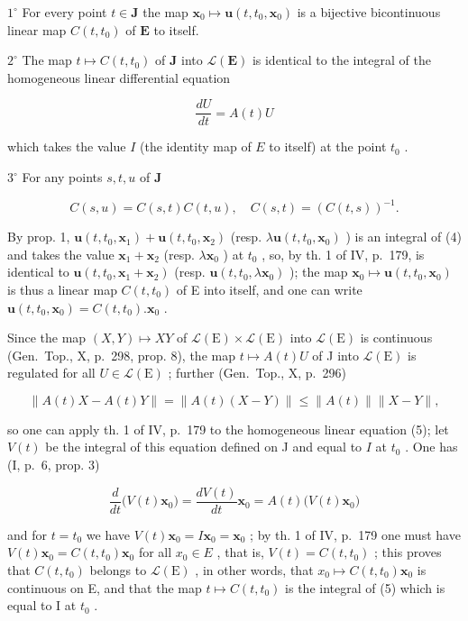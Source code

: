 \(1^{\circ}\) For every point \(t \in \mathbf{J}\) the map \(\mathbf{x}_0 \mapsto \mathbf{u}(t, t_0, \mathbf{x}_0)\) is a bijective bicontinuous linear map \(C(t, t_0)\) of \(\mathbf{E}\) to itself.

\(2^{\circ}\) The map \(t \mapsto C(t, t_0)\) of \(\mathbf{J}\) into \(\mathcal{L}(\mathbf{E})\) is identical to the integral of the homogeneous linear differential equation

\[
\frac {d U}{d t} = A (t) U\tag{5}
\]

which takes the value \(I\) (the identity map of \(E\) to itself) at the point \(t_0\) .

\(3^{\circ}\) For any points \(s, t, u\) of \(\mathbf{J}\)

\[
C (s, u) = C (s, t) C (t, u), \quad C (s, t) = (C (t, s)) ^ {- 1}.\tag{6}
\]

By prop. 1, \(\mathbf{u}(t,t_0,\mathbf{x}_1) + \mathbf{u}(t,t_0,\mathbf{x}_2)\) (resp. \(\lambda \mathbf{u}(t,t_0,\mathbf{x}_0)\) ) is an integral of (4) and takes the value \(\mathbf{x}_1 + \mathbf{x}_2\) (resp. \(\lambda \mathbf{x}_0\) ) at \(t_0\) , so, by th. 1 of IV, p.~179, is identical to \(\mathbf{u}(t,t_0,\mathbf{x}_1 + \mathbf{x}_2)\) (resp. \(\mathbf{u}(t,t_0,\lambda \mathbf{x}_0)\) ); the map \(\mathbf{x}_0\mapsto \mathbf{u}(t,t_0,\mathbf{x}_0)\) is thus a linear map \(C(t,t_0)\) of E into itself, and one can write \(\mathbf{u}(t,t_0,\mathbf{x}_0) = C(t,t_0).\mathbf{x}_0\) .

Since the map \((X, Y) \mapsto XY\) of \(\mathcal{L}(\mathrm{E}) \times \mathcal{L}(\mathrm{E})\) into \(\mathcal{L}(\mathrm{E})\) is continuous (Gen.~Top., X, p.~298, prop. 8), the map \(t \mapsto A(t)U\) of J into \(\mathcal{L}(\mathrm{E})\) is regulated for all \(U \in \mathcal{L}(\mathrm{E})\) ; further (Gen.~Top., X, p.~296)

\[
\| A (t) X - A (t) Y \| = \| A (t) (X - Y) \| \leqslant \| A (t) \| \| X - Y \|,
\]

so one can apply th. 1 of IV, p.~179 to the homogeneous linear equation (5); let \(V(t)\) be the integral of this equation defined on J and equal to \(I\) at \(t_0\) . One has (I, p.~6, prop. 3)

\[
\frac {d}{d t} \big (V (t) \mathbf {x} _ {0} \big) = \frac {d V (t)}{d t} \mathbf {x} _ {0} = A (t) \big (V (t) \mathbf {x} _ {0} \big)
\]

and for \(t = t_{0}\) we have \(V(t)\mathbf{x}_{0} = I\mathbf{x}_{0} = \mathbf{x}_{0}\) ; by th. 1 of IV, p.~179 one must have \(V(t)\mathbf{x}_{0} = C(t, t_{0})\mathbf{x}_{0}\) for all \(x_{0} \in E\) , that is, \(V(t) = C(t, t_{0})\) ; this proves that \(C(t, t_{0})\) belongs to \(\mathcal{L}(\mathrm{E})\) , in other words, that \(x_{0} \mapsto C(t, t_{0})\mathbf{x}_{0}\) is continuous on E, and that the map \(t \mapsto C(t, t_{0})\) is the integral of (5) which is equal to I at \(t_{0}\) .

